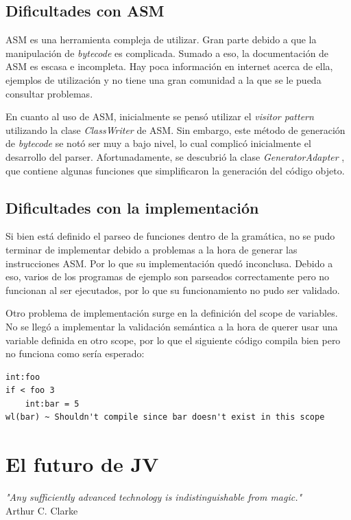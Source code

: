 \documentclass[spanish]{article}
\begin{document}
        \subsection{Dificultades con ASM}
            \par ASM es una herramienta compleja de utilizar. Gran parte debido a que la manipulación de \textit{bytecode} es complicada. Sumado a eso, la documentación de ASM es escasa e incompleta. Hay poca información en internet acerca de ella, ejemplos de utilización y no tiene una gran comunidad a la que se le pueda consultar problemas.
            \par En cuanto al uso de ASM, inicialmente se pensó utilizar el \textit{visitor pattern} utilizando la clase \textit{ClassWriter} de ASM. Sin embargo, este método de generación de \textit{bytecode} se notó ser muy a bajo nivel, lo cual complicó inicialmente el desarrollo del parser. Afortunadamente, se descubrió la clase \textit{GeneratorAdapter} \cite{asm_doc_ga}, que contiene algunas funciones que simplificaron la generación del código objeto.
        \subsection{Dificultades con la implementación}
                \par Si bien está definido el parseo de funciones dentro de la gramática, no se pudo terminar de implementar debido a problemas a la hora de generar las instrucciones ASM. Por lo que su implementación quedó inconclusa. Debido a eso, varios de los programas de ejemplo son parseados correctamente pero no funcionan al ser ejecutados, por lo que su funcionamiento no pudo ser validado.
                \par Otro problema de implementación surge en la definición del scope de variables. No se llegó a implementar la validación semántica a la hora de querer usar una variable definida en otro scope, por lo que el siguiente código compila bien pero no funciona como sería esperado:
                \begin{lstlisting}
int:foo
if < foo 3
    int:bar = 5
wl(bar) ~ Shouldn't compile since bar doesn't exist in this scope
                \end{lstlisting}
        \clearpage

    \section{El futuro de JV}
        \begin{center}
            \par\textit{"Any sufficiently advanced technology is indistinguishable from magic."}\\Arthur C. Clarke\\
        \end{center}
\end{document}
